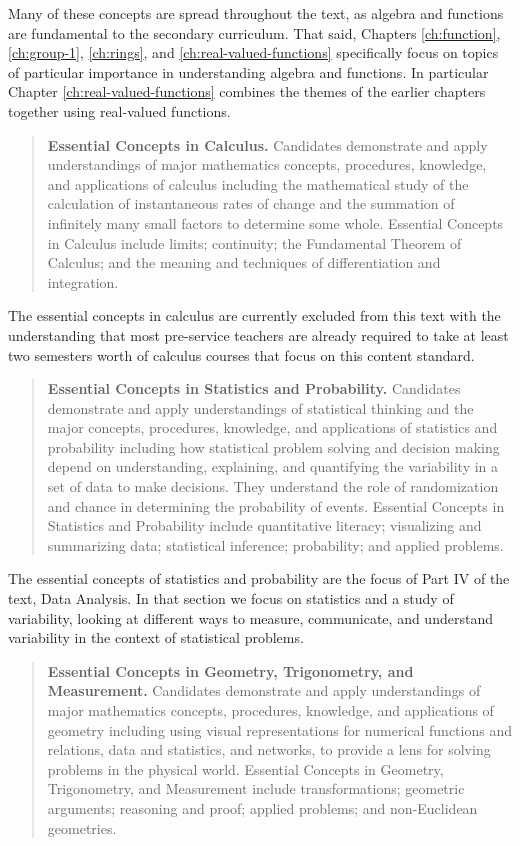 \documentclass[
]{book}
\theoremstyle{definition}
\theoremstyle{definition}
\theoremstyle{definition}
\theoremstyle{remark}
\begin{document}
Many of these concepts are spread throughout the text, as algebra and functions are fundamental to the secondary curriculum. That said, Chapters \ref{ch:function}, \ref{ch:group-1}, \ref{ch:rings}, and \ref{ch:real-valued-functions} specifically focus on topics of particular importance in understanding algebra and functions. In particular Chapter \ref{ch:real-valued-functions} combines the themes of the earlier chapters together using real-valued functions.

\begin{quote}
\textbf{Essential Concepts in Calculus.} Candidates demonstrate and apply understandings of major mathematics concepts, procedures, knowledge, and applications of calculus including the mathematical study of the calculation of instantaneous rates of change and the summation of infinitely many small factors to determine some whole. Essential Concepts in Calculus include limits; continuity; the Fundamental Theorem of Calculus; and the meaning and techniques of differentiation and integration.
\end{quote}

The essential concepts in calculus are currently excluded from this text with the understanding that most pre-service teachers are already required to take at least two semesters worth of calculus courses that focus on this content standard.

\begin{quote}
\textbf{Essential Concepts in Statistics and Probability.} Candidates demonstrate and apply understandings of statistical thinking and the major concepts, procedures, knowledge, and applications of statistics and probability including how statistical problem solving and decision making depend on understanding, explaining, and quantifying the variability in a set of data to make decisions. They understand the role of randomization and chance in determining the probability of events. Essential Concepts in Statistics and Probability include quantitative literacy; visualizing and summarizing data; statistical inference; probability; and applied problems.
\end{quote}

The essential concepts of statistics and probability are the focus of Part IV of the text, Data Analysis. In that section we focus on statistics and a study of variability, looking at different ways to measure, communicate, and understand variability in the context of statistical problems.

\begin{quote}
\textbf{Essential Concepts in Geometry, Trigonometry, and Measurement.} Candidates demonstrate and apply understandings of major mathematics concepts, procedures, knowledge, and applications of geometry including using visual representations for numerical functions and relations, data and statistics, and networks, to provide a lens for solving problems in the physical world. Essential Concepts in Geometry, Trigonometry, and Measurement include transformations; geometric arguments; reasoning and proof; applied problems; and non-Euclidean geometries.
\end{quote}
\end{document}
